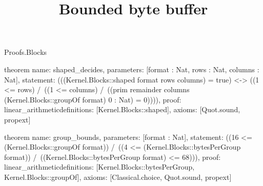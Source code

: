 \begin{lexlean}{Proofs.Blocks}
\title{Bounded byte buffer}
\begin{semanticmodule}
theorem{
  name: shaped_decides,
  parameters: [format : Nat, rows : Nat, columns : Nat],
  statement: (((Kernel.Blocks::shaped format rows columns) = true) <-> ((1 <= rows) /\ ((1 <= columns) /\ ((prim remainder columns (Kernel.Blocks::groupOf format) 0 : Nat) = 0)))),
  proof: linear_arithmetic{definitions: [Kernel.Blocks::shaped]},
  axioms: [Quot.sound, propext]
}

theorem{
  name: group_bounds,
  parameters: [format : Nat],
  statement: ((16 <= (Kernel.Blocks::groupOf format)) /\ ((4 <= (Kernel.Blocks::bytesPerGroup format)) /\ ((Kernel.Blocks::bytesPerGroup format) <= 68))),
  proof: linear_arithmetic{definitions: [Kernel.Blocks::bytesPerGroup, Kernel.Blocks::groupOf]},
  axioms: [Classical.choice, Quot.sound, propext]
}
\end{semanticmodule}
\end{lexlean}
